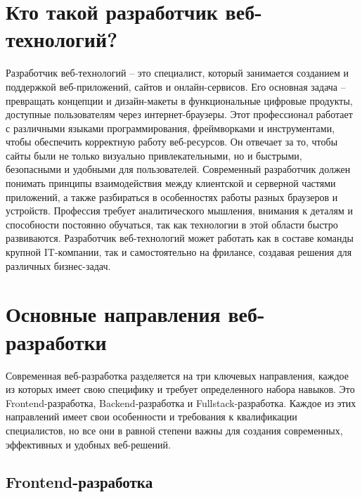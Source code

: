 \documentclass[referat]{SCWorks}
\begin{document}
\section{Кто такой разработчик веб-технологий?}

Разработчик веб-технологий -- это специалист, который занимается созданием и поддержкой веб-приложений, сайтов и онлайн-сервисов. Его основная задача -- превращать концепции и дизайн-макеты в функциональные цифровые продукты, доступные пользователям через интернет-браузеры. Этот профессионал работает с различными языками программирования, фреймворками и инструментами, чтобы обеспечить корректную работу веб-ресурсов. Он отвечает за то, чтобы сайты были не только визуально привлекательными, но и быстрыми, безопасными и удобными для пользователей. Современный разработчик должен понимать принципы взаимодействия между клиентской и серверной частями приложений, а также разбираться в особенностях работы разных браузеров и устройств. Профессия требует аналитического мышления, внимания к деталям и способности постоянно обучаться, так как технологии в этой области быстро развиваются. Разработчик веб-технологий может работать как в составе команды крупной IT-компании, так и самостоятельно на фрилансе, создавая решения для различных бизнес-задач.\cite{web_technologies}

\section{Основные направления веб-разработки}

Современная веб-разработка разделяется на три ключевых направления, каждое из которых имеет свою специфику и требует определенного набора навыков. Это Frontend-разработка, Backend-разработка и Fullstack-разработка. Каждое из этих направлений имеет свои особенности и требования к квалификации специалистов, но все они в равной степени важны для создания современных, эффективных и удобных веб-решений.\cite{web_technologies}

\subsection{Frontend-разработка}
\end{document}
